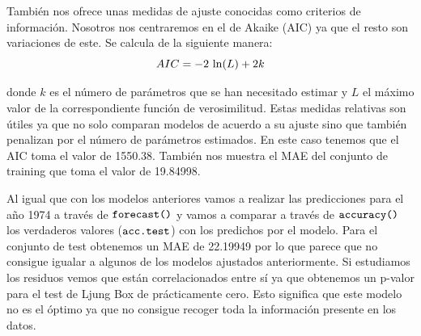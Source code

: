También nos ofrece unas medidas de ajuste conocidas como criterios de información. Nosotros nos centraremos en el de Akaike (AIC) ya que el resto son variaciones de este. Se calcula de la siguiente manera:
\begin{equation}
    AIC = -2 \thinspace \ln (L) + 2k
\end{equation}

\noindent donde $k$ es el número de parámetros que se han necesitado estimar y $L$ el máximo valor de la correspondiente función de verosimilitud. Estas medidas relativas son útiles ya que no solo comparan modelos de acuerdo a su ajuste sino que también penalizan por el número de parámetros estimados. En este caso tenemos que el AIC toma el valor de 1550.38. También nos muestra el MAE del conjunto de training que toma el valor de 19.84998.

Al igual que con los modelos anteriores vamos a realizar las predicciones para el año 1974 a través de $\verb!forecast()!$ y vamos a comparar a través de $\verb!accuracy()!$ los verdaderos valores ($\verb!acc.test!$) con los predichos por el modelo. Para el conjunto de test obtenemos un MAE de 22.19949 por lo que parece que no consigue igualar a algunos de los modelos ajustados anteriormente. Si estudiamos los residuos vemos que están correlacionados entre sí ya que obtenemos un p-valor para el test de Ljung Box de prácticamente cero. Esto significa que este modelo no es el óptimo ya que no consigue recoger toda la información presente en los datos.

